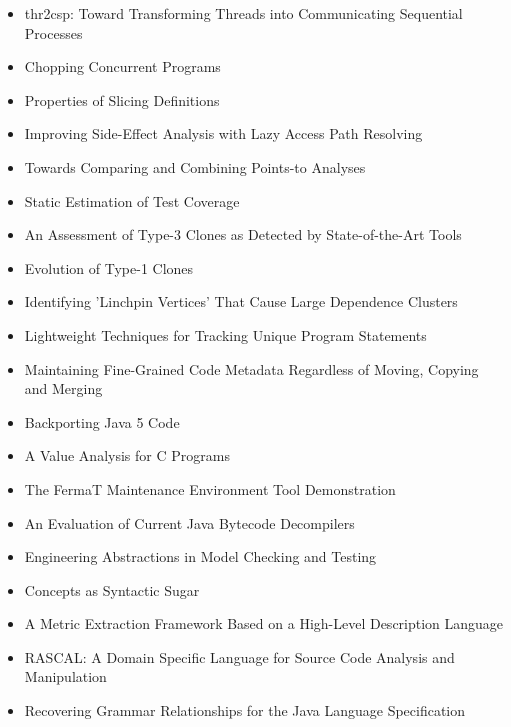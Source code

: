 {\small
\begin{itemize}[itemsep=-1ex]
  \item thr2csp: Toward Transforming Threads into Communicating Sequential Processes {\color{blue} \checkmark}{\color{red} \texttimes}
  \item Chopping Concurrent Programs
  \item Properties of Slicing Definitions
  \item Improving Side-Effect Analysis with Lazy Access Path Resolving {\color{blue} \checkmark}{\color{red} \texttimes}
  \item Towards Comparing and Combining Points-to Analyses {\color{blue} \checkmark}{\color{red} \texttimes}
  \item Static Estimation of Test Coverage {\color{blue} \checkmark}{\color{red} \texttimes}
  \item An Assessment of Type-3 Clones as Detected by State-of-the-Art Tools
  \item Evolution of Type-1 Clones
  \item Identifying 'Linchpin Vertices' That Cause Large Dependence Clusters {\color{blue} \checkmark}{\color{red} \texttimes}
  \item Lightweight Techniques for Tracking Unique Program Statements
  \item Maintaining Fine-Grained Code Metadata Regardless of Moving, Copying and Merging
  \item Backporting Java 5 Code
  \item A Value Analysis for C Programs
  \item The FermaT Maintenance Environment Tool Demonstration
  \item An Evaluation of Current Java Bytecode Decompilers
  \item Engineering Abstractions in Model Checking and Testing {\color{blue} \checkmark}{\color{red} \texttimes}
  \item Concepts as Syntactic Sugar {\color{blue} \checkmark}{\color{red} \texttimes}
  \item A Metric Extraction Framework Based on a High-Level Description Language {\color{blue} \checkmark}{\color{red} \texttimes}
  \item RASCAL: A Domain Specific Language for Source Code Analysis and Manipulation {\color{blue} \checkmark}{\color{red} \texttimes}
  \item Recovering Grammar Relationships for the Java Language Specification {\color{blue} \checkmark}{\color{red} \texttimes}
\end{itemize}
}

